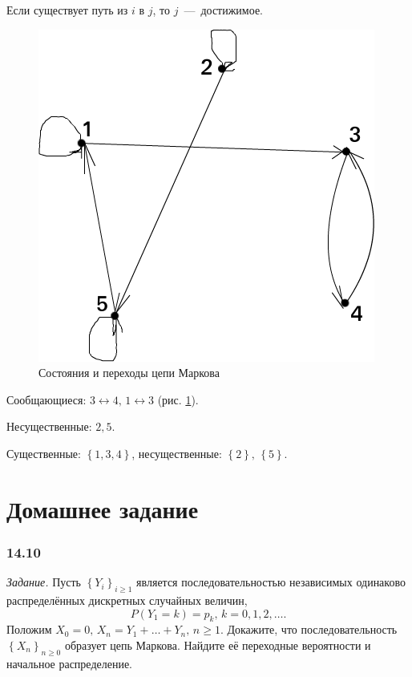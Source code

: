 Если существует путь из $i$ в $j$, то $j$~---~достижимое.

\begin{figure}[h!]
  \centering
  \includegraphics[width=.4\textwidth]{./pictures/14_6.png}
  \caption{Состояния и переходы цепи Маркова}
  \label{fig:146}
\end{figure}

Сообщающиеся: $3 \leftrightarrow 4, \, 1 \leftrightarrow 3$ (рис. \ref{fig:146}).

Несущественные: $2, 5$.

Существенные: $ \left\{ 1, 3, 4 \right\} $, несущественные:
$ \left\{ 2 \right\}, \, \left\{ 5 \right\} $.

\section*{Домашнее задание}

\subsubsection*{14.10}

\textit{Задание.}
Пусть $ \left\{ Y_i \right\}_{i \geq 1}$
является последовательностью независимых одинаково распределённых дискретных случайных величин,
\begin{equation*}
  P \left( Y_1 = k \right) = p_k, \,
  k = 0, 1, 2, \dotsc.
\end{equation*}
Положим $X_0 = 0, \, X_n = Y_1 + \dotsc + Y_n, \, n \geq 1$.
Докажите, что последовательность $ \left\{ X_n \right\}_{n \geq 0}$ образует цепь Маркова.
Найдите её переходные вероятности и начальное распределение.

